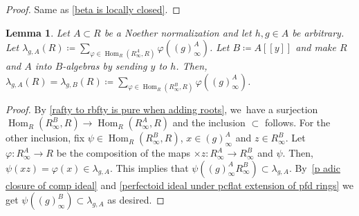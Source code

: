\documentclass[11pt]{article}
\let\autoref\cref
\theoremstyle{plain}
\newtheorem{lemma}[theorem]{Lemma}
\theoremstyle{definition}
\numberwithin{equation}{theorem}
\DeclareMathOperator{\Hom}{Hom}
\newcommand{\llbracket}{[\![}
\newcommand{\rrbracket}{]\!]}
\renewcommand{\phi}{\varphi}
\newcommand{\rafty}{R^A_\infty}
\newcommand{\rbfty}{R^B_\infty}
\begin{document}
\begin{proof}
Same as \autoref{beta is locally closed}.
\end{proof}

\begin{lemma}\label{trace does not depend on choice of A}
Let $A\subset R$ be a Noether normalization and let $h,g\in A$ be arbitrary. Let $\lambda_{g,A}(R)\coloneqq \sum_{\phi\in \Hom_R\left(\rafty,R\right)}\phi\left((g)^A_\infty\right)$. Let $B\coloneqq A\llbracket y\rrbracket$ and make $R$ and $A$ into $B$\nobreakdash-algebras by sending $y$ to $h$. Then, $\lambda_{g,A}(R)=\lambda_{g,B}(R)\coloneqq \sum_{\phi\in \Hom_R\left(\rbfty,R\right)}\phi\left((g)^A_\infty\right)$.
\end{lemma}

\begin{proof}
By \autoref{rafty to rbfty is pure when adding roots}, we~have a surjection $\Hom_R(\rbfty,R)\to \Hom_R(\rafty,R)$ and the inclusion $\subset$ follows. For the other inclusion, fix $\psi\in \Hom_R(\rbfty,R)$, $x\in (g)^A_\infty$ and $z\in \rbfty$. Let $\phi\colon \rafty\to R$ be the composition of the maps $\times z\colon \rafty\to \rbfty$ and $\psi$. Then, $\psi(xz)=\phi(x)\in \lambda_{g,A}$. This implies that $\psi((g)^A_\infty \rbfty)\subset \lambda_{g,A}$. By~\autoref{p adic closure of comp ideal} and \autoref{perfectoid ideal under pcflat extension of pfd rings} we get $\psi((g)^B_\infty)\subset \lambda_{g,A}$ as desired.
\end{proof}
\end{document}
